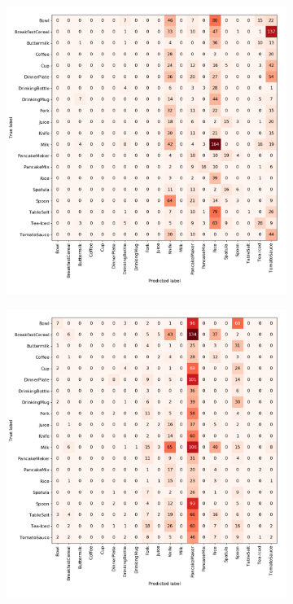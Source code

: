 \begin{figure}
\centering
	\begin{subfigure}[b]{0.48\textwidth}
		\includegraphics[scale=.27]{img/chapter6/unrealEx1_color}
	\end{subfigure}
	\begin{subfigure}[b]{0.48\textwidth}
		\includegraphics[scale=.27]{img/chapter6/unrealEx1_shape}	

\end{subfigure}
\end{figure}
